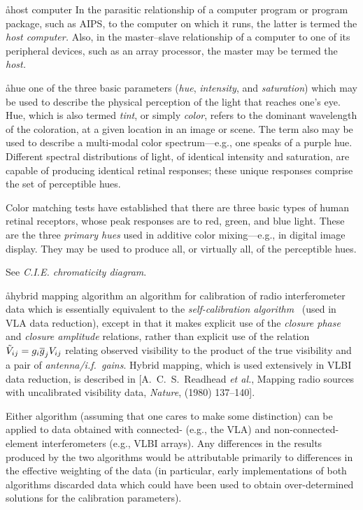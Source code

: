 \aa{host computer}
In the parasitic relationship of a computer program or program package,
such as AIPS, to the computer on which it runs, the latter is
termed the {\it host computer.}
Also, in the master--slave relationship of a computer to
one of its peripheral devices, such as an array processor,
the master may be termed the {\it host.}

\aa{hue}
one of the three basic parameters ({\it hue}, {\it intensity},
and {\it saturation}\/) which may be used to describe the
physical perception of the light that reaches one's eye.
Hue, which is also termed {\it tint}, or simply {\it color},
refers to the dominant wavelength of the coloration,
at a given location in an image or scene.
The term also may be used to describe
a multi-modal color spectrum---e.g., one speaks of a purple hue.
Different spectral distributions of light,
of identical intensity and saturation,
are capable of producing identical retinal responses;
these unique responses comprise the set of perceptible hues.
\par
Color matching tests have established that
there are three basic types of human retinal receptors,
whose peak responses are to red, green, and blue light.
These are the three {\it primary hues} used in additive color
mixing---e.g., in digital image display.
They may be used to produce all, or virtually all, of the
perceptible hues.
\par
See {\it C.I.E. chromaticity diagram}.

\aa{hybrid mapping algorithm}
an algorithm for calibration of radio interferometer data
which is essentially equivalent to the {\it self-calibration
algorithm} \qv\ (used in VLA data reduction), except in that it
makes explicit use of the {\it closure phase} and
{\it closure amplitude} relations,
rather than explicit use of the relation
$\tilde V_{ij}=g_i\overline g_jV_{ij}$
relating observed visibility to the product of the true
visibility and a pair of {\it antenna/i.f.\ gains}.
Hybrid mapping, which is used extensively in VLBI data reduction,
is described in
[A.~C.~S.~Readhead {\it et al.}, Mapping radio sources with
uncalibrated visibility data, {\it Nature}, 
(1980) 137--140].
\par
Either algorithm (assuming that one cares to make some distinction)
can be applied to data obtained with connected-
(e.g., the VLA) and non-connected-element
interferometers (e.g., VLBI arrays).
Any differences in the results produced by the two algorithms
would be attributable primarily to differences in the effective weighting
of the data (in particular, early implementations of both
algorithms discarded data which could have been used to obtain over-determined
solutions for the calibration parameters).

